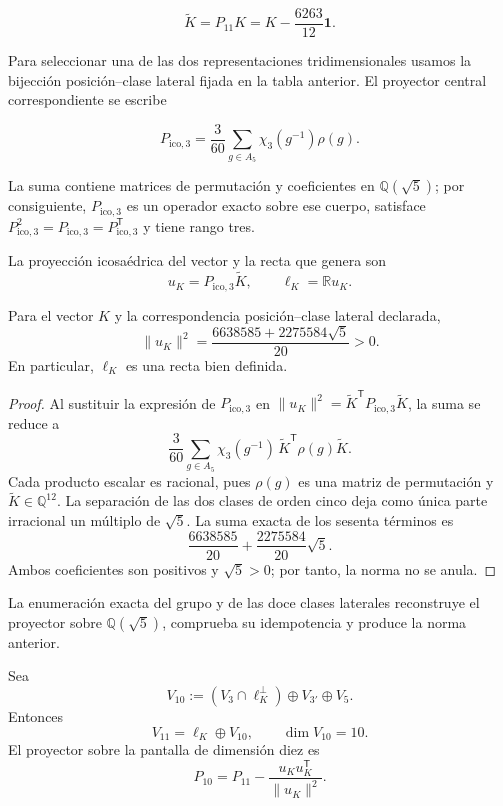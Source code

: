 \[
\widetilde K=P_{11}K
=K-\frac{6263}{12}\mathbf1.
\]

Para seleccionar una de las dos representaciones tridimensionales usamos la
bijección posición--clase lateral fijada en la tabla anterior. El proyector central
correspondiente se escribe

\[
P_{\mathrm{ico},3}=\frac{3}{60}\sum_{g\in A_5}\chi_3(g^{-1})\rho(g).
\]

La suma contiene matrices de permutación y coeficientes en
\(\mathbb Q(\sqrt5)\); por consiguiente, \(P_{\mathrm{ico},3}\) es un operador exacto sobre
ese cuerpo, satisface \(P_{\mathrm{ico},3}^2=P_{\mathrm{ico},3}=P_{\mathrm{ico},3}^{\mathsf T}\) y tiene rango tres.

\begin{definition}
La proyección icosaédrica del vector y la recta que genera son
\[
u_K=P_{\mathrm{ico},3}\widetilde K,
\qquad
\ell_K=\mathbb R u_K.
\]
\end{definition}

\begin{lemma}
\label{lem:norma-uk}
Para el vector \(K\) y la correspondencia posición--clase lateral declarada,
\[
\|u_K\|^2
=\frac{6638585+2275584\sqrt5}{20}>0.
\]
En particular, \(\ell_K\) es una recta bien definida.
\end{lemma}

\begin{proof}
Al sustituir la expresión de \(P_{\mathrm{ico},3}\) en
\(\|u_K\|^2=\widetilde K^{\mathsf T}P_{\mathrm{ico},3}\widetilde K\), la suma se reduce a
\[
\frac3{60}\sum_{g\in A_5}
\chi_3(g^{-1})\,
\widetilde K^{\mathsf T}\rho(g)\widetilde K.
\]
Cada producto escalar es racional, pues \(\rho(g)\) es una matriz de
permutación y \(\widetilde K\in\mathbb Q^{12}\). La separación de las dos
clases de orden cinco deja como única parte irracional un múltiplo de
\(\sqrt5\). La suma exacta de los sesenta términos es
\[
\frac{6638585}{20}+\frac{2275584}{20}\sqrt5.
\]
Ambos coeficientes son positivos y \(\sqrt5>0\); por tanto, la norma no se
anula.
\end{proof}

La enumeración exacta del grupo y de las doce clases laterales reconstruye el
proyector sobre \(\mathbb Q(\sqrt5)\), comprueba su idempotencia y produce la
norma anterior.

\begin{theorem}
\label{thm:once-diez}
Sea
\[
V_{10}:=(V_3\cap\ell_K^\perp)\oplus V_{3'}\oplus V_5.
\]
Entonces
\[
V_{11}=\ell_K\oplus V_{10},
\qquad
\dim V_{10}=10.
\]
El proyector sobre la pantalla de dimensión diez es
\[
P_{10}=P_{11}-\frac{u_Ku_K^{\mathsf T}}{\|u_K\|^2}.
\]
\end{theorem}

